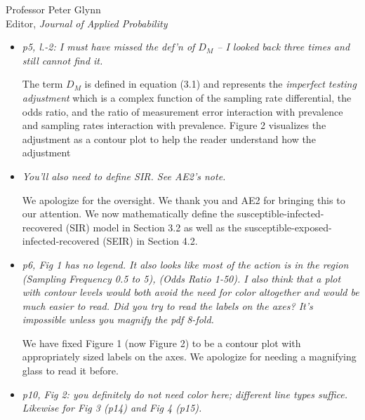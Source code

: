 \documentclass[11pt]{letter} %
\begin{document}
\begin{letter}{Professor
	Peter Glynn\\
	Editor, {\em Journal of Applied Probability}}
\begin{itemize}
\vspace{5mm}
We are focused exclusively on the binary outcome setting where $Y_j \in \{0,1\}$ as one is either COVID-19 positive~($Y_j = 1$) or negative~($Y_j = 0$).  Under measurement error, we observe $Y_j^\star \in \{0,1\}$ which is equal to $Y_j (1-P_j) + (1-Y_j) P_j$ where $P_j$ is the binary indicator of observing the incorrect value.
\vspace{5mm}

\item {\it p5, l.-2:  I must have missed the def'n of $D_M$ -- I looked back
three times and still cannot find it.}

\vspace{5mm}
The term $D_M$ is defined in equation (3.1) and represents the \emph{imperfect testing adjustment} which is a complex function of the sampling rate differential, the odds ratio, and the ratio of measurement error interaction with prevalence and sampling rates interaction with prevalence.  Figure 2 visualizes the adjustment as a contour plot to help the reader understand how the adjustment
\vspace{5mm}

\item {\it You'll also need to define SIR.  See AE2's note.}

\vspace{5mm}
We apologize for the oversight.  We thank you and AE2 for bringing this to our attention.  We now mathematically define the susceptible-infected-recovered (SIR) model in Section 3.2 as well as the susceptible-exposed-infected-recovered (SEIR) in Section 4.2.
\vspace{5mm}

\item {\it p6, Fig 1 has no legend.  It also looks like most of the action is in the region (Sampling Frequency 0.5 to 5), (Odds Ratio 1-50). I also think that a plot with contour levels would both avoid the need for color altogether and would be much easier to read.  Did you try to read the labels on the axes?  It's impossible unless you magnify the pdf 8-fold.}


\vspace{5mm}
We have fixed Figure 1 (now Figure 2) to be a contour plot with appropriately sized labels on the axes. We apologize for needing a magnifying glass to read it before.
\vspace{5mm}

\item {\it p10, Fig 2: you definitely do not need color here; different
line types suffice.  Likewise for Fig 3 (p14) and Fig 4 (p15).}


\end{itemize}
\end{letter}
\end{document}
